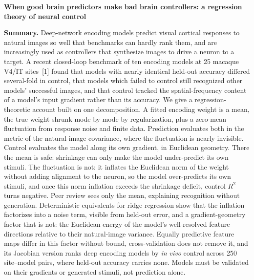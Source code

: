 \documentclass[12pt,letterpaper]{article}
\begin{document}
{\large\bfseries When good brain predictors make bad brain controllers: a regression theory of neural control\par}
\vspace{2pt}

\textbf{Summary.}
Deep-network encoding models predict visual cortical responses to natural images so well that benchmarks can hardly rank them, and are increasingly used as controllers that synthesize images to drive a neuron to a target. A recent closed-loop benchmark of ten encoding models at 25 macaque V4/IT sites~[1] found that models with nearly identical held-out accuracy differed several-fold in control, that models which failed to control still recognized other models' successful images, and that control tracked the spatial-frequency content of a model's input gradient rather than its accuracy. We give a regression-theoretic account built on one decomposition. A fitted encoding weight is a mean, the true weight shrunk mode by mode by regularization, plus a zero-mean fluctuation from response noise and finite data. Prediction evaluates both in the metric of the natural-image covariance, where the fluctuation is nearly invisible. Control evaluates the model along its own gradient, in Euclidean geometry. There the mean is safe: shrinkage can only make the model under-predict its own stimuli. The fluctuation is not: it inflates the Euclidean norm of the weight without adding alignment to the neuron, so the model over-predicts its own stimuli, and once this norm inflation exceeds the shrinkage deficit, control $R^2$ turns negative. Peer review sees only the mean, explaining recognition without generation. Deterministic equivalents for ridge regression show that the inflation factorizes into a noise term, visible from held-out error, and a gradient-geometry factor that is not: the Euclidean energy of the model's well-resolved feature directions relative to their natural-image variance. Equally predictive feature maps differ in this factor without bound, cross-validation does not remove it, and its Jacobian version ranks deep encoding models by \emph{in vivo} control across 250 site--model pairs, where held-out accuracy carries none. Models must be validated on their gradients or generated stimuli, not prediction alone.
\end{document}
